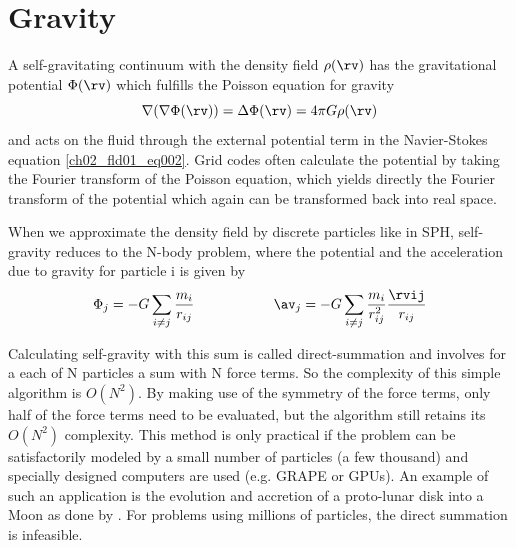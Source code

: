 \section{Gravity}
A self-gravitating continuum with the density field $\rho(\rv)$ has the gravitational potential $\Phi(\rv)$ which fulfills the Poisson equation for gravity
\begin{equation}
\label{ch02_sph01_eq038}
\nabla ( \nabla \Phi(\rv) ) = \Delta \Phi(\rv) = 4 \pi G \rho(\rv)
\end{equation}
and acts on the fluid through the external potential term in the Navier-Stokes equation \ref{ch02_fld01_eq002}. Grid codes often calculate the potential by taking the Fourier transform of the Poisson equation, which yields directly the Fourier transform of the potential which again can be transformed back into real space.

When we approximate the density field by discrete particles like in SPH, self-gravity reduces to the N-body problem, where the potential and the acceleration due to gravity for particle i is given by
\begin{equation}
\label{ch02_sph01_eq038}
\Phi_j = - G \sum_{i \ne j} \frac{m_i}{r_{ij}} \hspace{2.0cm} \av_j = - G \sum_{i \ne j} \frac{m_i}{r_{ij}^2} \frac{\rvij}{r_{ij}} 
\end{equation}

Calculating self-gravity with this sum is called direct-summation and involves for a each of N particles a sum with N force terms. So the complexity of this simple algorithm is $O(N^2)$. By making use of the symmetry of the force terms, only half of the force terms need to be evaluated, but the algorithm still retains its $O(N^2)$ complexity. This method is only practical if the problem can be satisfactorily modeled by a small number of particles (a few thousand) and specially designed computers are used (e.g. GRAPE or GPUs). An example of such an application is the evolution and accretion of a proto-lunar disk into a Moon as done by \cite{Kokubo:2000p2195}. For problems using millions of particles, the direct summation is infeasible.


